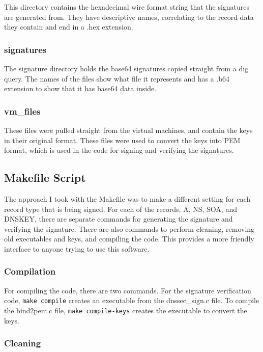 This directory contains the hexadecimal wire format string that the signatures are generated from. They have 
descriptive names, correlating to the record data they contain and end in a .hex extension.

\subsubsection{signatures}

The signature directory holds the base64 signatures copied straight from a dig query. The names of the files 
show what file it represents and has a .b64 extension to show that it has base64 data inside.

\subsubsection{vm\_files}

These files were pulled straight from the virtual machines, and contain the keys in their original format. These files were used to convert 
the keys into PEM format, which is used in the code for signing and verifying the signatures.

\subsection{Makefile Script}

The approach I took with the Makefile was to make a different setting for each record type that is being signed.
For each of the records, A, NS, SOA, and DNSKEY, there are separate commands for generating the signature and verifying the signature. 
There are also commands to perform cleaning, removing old executables and keys, and compiling the code. This provides a more friendly 
interface to anyone trying to use this software.

\subsubsection{Compilation}

For compiling the code, there are two commands. For the signature verification code, \texttt{make compile} creates an 
executable from the dnssec\_sign.c file. To compile the bind2pem.c file, \texttt{make compile-keys} creates the executable 
to convert the keys.

\subsubsection{Cleaning}

